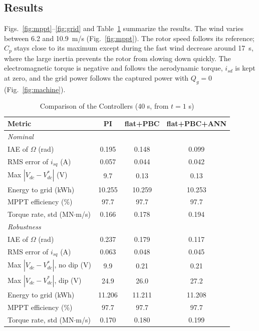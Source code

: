 \documentclass[conference]{IEEEtran}
\begin{document}
\subsection{Results}
Figs.~\ref{fig:mppt}--\ref{fig:grid} and Table~\ref{tab:res} summarize the results. The wind varies
between 6.2 and 10.9~m/s (Fig.~\ref{fig:mppt}). The rotor speed follows its reference; $C_p$
stays close to its maximum except during the fast wind decrease around 17~s, where the large inertia
prevents the rotor from slowing down quickly. The electromagnetic torque is negative and follows the
aerodynamic torque, $i_{sd}$ is kept at zero, and the grid power follows the captured power with
$Q_g=0$ (Fig.~\ref{fig:machine}).

\begin{table}[t]
\caption{Comparison of the Controllers (40 s, from $t=1$ s)}
\label{tab:res}
\centering
\footnotesize
\setlength{\tabcolsep}{3pt}
\begin{tabular}{lccc}
\toprule
Metric & PI & flat+PBC & flat+PBC+ANN\\
\midrule
\multicolumn{4}{l}{\emph{Nominal}}\\
IAE of $\Omega$ (rad) & 0.195 & 0.148 & 0.099\\
RMS error of $i_{sq}$ (A) & 0.057 & 0.044 & 0.042\\
Max $|V_{dc}-V_{dc}^*|$ (V) & 9.7 & 0.13 & 0.13\\
Energy to grid (kWh) & 10.255 & 10.259 & 10.253\\
MPPT efficiency (\%) & 97.7 & 97.7 & 97.7\\
Torque rate, std (MN$\cdot$m/s) & 0.166 & 0.178 & 0.194\\
\midrule
\multicolumn{4}{l}{\emph{Robustness}}\\
IAE of $\Omega$ (rad) & 0.237 & 0.179 & 0.117\\
RMS error of $i_{sq}$ (A) & 0.063 & 0.048 & 0.045\\
Max $|V_{dc}-V_{dc}^*|$, no dip (V) & 9.9 & 0.21 & 0.21\\
Max $|V_{dc}-V_{dc}^*|$, dip (V) & 24.9 & 26.0 & 27.2\\
Energy to grid (kWh) & 11.206 & 11.211 & 11.208\\
MPPT efficiency (\%) & 97.7 & 97.7 & 97.7\\
Torque rate, std (MN$\cdot$m/s) & 0.170 & 0.180 & 0.199\\
\bottomrule
\end{tabular}
\end{table}
\end{document}

